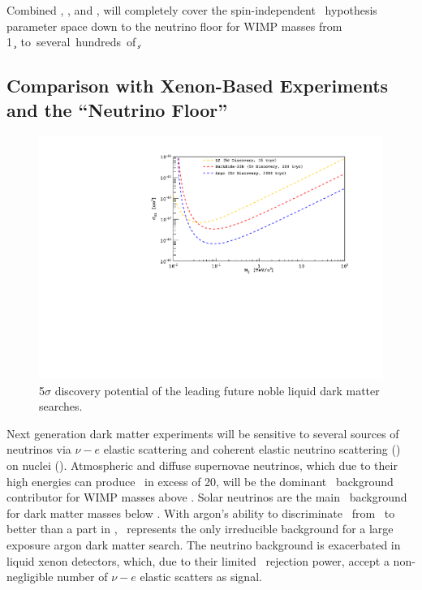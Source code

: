 Combined \DSks, \DSls, and \Argo, will completely cover the spin-independent \WIMP\ hypothesis parameter space down to the neutrino floor for WIMP masses from \SI{1}{\GeV\per\square\c} to several hundreds of \si{\TeV\per\square\c}.

\subsection{Comparison with Xenon-Based Experiments and the ``Neutrino Floor''}
\label{sec:IM-SC-XenonComp}

\begin{figure}
\begin{center}
\includegraphics[width=\textwidth]{./Figures/NobleDiscoveryComp.pdf}
\caption{5$\sigma$ discovery potential of the leading future noble liquid dark matter searches.}
\label{fig:NobleDiscoveryComp}
\end{center}
\end{figure}

Next generation dark matter experiments will be sensitive to several sources of neutrinos via $\nu-e$ elastic scattering and coherent elastic neutrino scattering (\CEnNS) on nuclei (\NR). Atmospheric and diffuse supernovae neutrinos, which due to their high energies can produce \NRs\ in excess of \SI{20}{\keVr}, will be the dominant \CEnNS\ background contributor for WIMP masses above \DSkHighMassThreshold. Solar neutrinos are the main \CEnNS\ background for dark matter masses below \DSlLowMassThreshold. With  argon's ability to discriminate \ER\ from \NR\ to better than a part in \DEAPPSDRejection, \CEnNS\ represents the only irreducible background for a large exposure argon dark matter search. The neutrino background is exacerbated in liquid xenon detectors, which, due to their limited \ER\ rejection power, accept a non-negligible number of $\nu-e$ elastic scatters as signal. 

